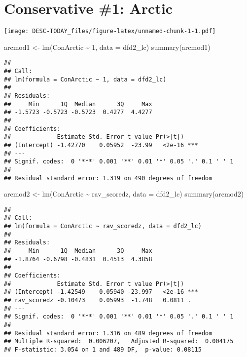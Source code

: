 \documentclass[
]{article}
\newenvironment{Shaded}{\begin{snugshade}}{\end{snugshade}}
\newcommand{\AttributeTok}[1]{\textcolor[rgb]{0.77,0.63,0.00}{#1}}
\newcommand{\DecValTok}[1]{\textcolor[rgb]{0.00,0.00,0.81}{#1}}
\newcommand{\FunctionTok}[1]{\textcolor[rgb]{0.00,0.00,0.00}{#1}}
\newcommand{\NormalTok}[1]{#1}
\newcommand{\OtherTok}[1]{\textcolor[rgb]{0.56,0.35,0.01}{#1}}
\newcommand{\SpecialCharTok}[1]{\textcolor[rgb]{0.00,0.00,0.00}{#1}}
\begin{document}
\hypertarget{conservative-1-arctic}{%
\section{Conservative \#1: Arctic}\label{conservative-1-arctic}}

\texttt{[image: DESC-TODAY\_files/figure-latex/unnamed-chunk-1-1.pdf]}

\begin{Shaded}
\begin{Highlighting}[]
\NormalTok{arcmod1 }\OtherTok{\textless{}{-}} \FunctionTok{lm}\NormalTok{(ConArctic }\SpecialCharTok{\textasciitilde{}} \DecValTok{1}\NormalTok{, }\AttributeTok{data =}\NormalTok{ dfd2\_lc)}
\FunctionTok{summary}\NormalTok{(arcmod1)}
\end{Highlighting}
\end{Shaded}

\begin{verbatim}
## 
## Call:
## lm(formula = ConArctic ~ 1, data = dfd2_lc)
## 
## Residuals:
##     Min      1Q  Median      3Q     Max 
## -1.5723 -0.5723 -0.5723  0.4277  4.4277 
## 
## Coefficients:
##             Estimate Std. Error t value Pr(>|t|)    
## (Intercept) -1.42770    0.05952  -23.99   <2e-16 ***
## ---
## Signif. codes:  0 '***' 0.001 '**' 0.01 '*' 0.05 '.' 0.1 ' ' 1
## 
## Residual standard error: 1.319 on 490 degrees of freedom
\end{verbatim}

\begin{Shaded}
\begin{Highlighting}[]
\NormalTok{arcmod2 }\OtherTok{\textless{}{-}} \FunctionTok{lm}\NormalTok{(ConArctic }\SpecialCharTok{\textasciitilde{}}\NormalTok{ rav\_scoredz, }\AttributeTok{data =}\NormalTok{ dfd2\_lc)}
\FunctionTok{summary}\NormalTok{(arcmod2)}
\end{Highlighting}
\end{Shaded}

\begin{verbatim}
## 
## Call:
## lm(formula = ConArctic ~ rav_scoredz, data = dfd2_lc)
## 
## Residuals:
##     Min      1Q  Median      3Q     Max 
## -1.8764 -0.6798 -0.4831  0.4513  4.3858 
## 
## Coefficients:
##             Estimate Std. Error t value Pr(>|t|)    
## (Intercept) -1.42549    0.05940 -23.997   <2e-16 ***
## rav_scoredz -0.10473    0.05993  -1.748   0.0811 .  
## ---
## Signif. codes:  0 '***' 0.001 '**' 0.01 '*' 0.05 '.' 0.1 ' ' 1
## 
## Residual standard error: 1.316 on 489 degrees of freedom
## Multiple R-squared:  0.006207,   Adjusted R-squared:  0.004175 
## F-statistic: 3.054 on 1 and 489 DF,  p-value: 0.08115
\end{verbatim}
\end{document}
